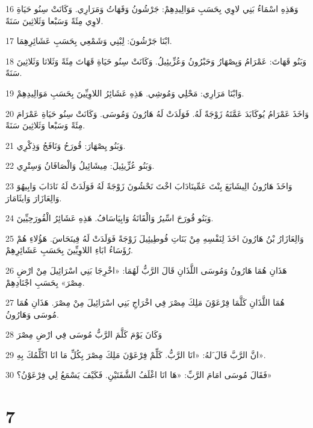 \par 16 وَهَذِهِ اسْمَاءُ بَنِي لاوِي بِحَسَبِ مَوَالِيدِهِمْ: جَرْشُونُ وَقَهَاتُ وَمَرَارِي. وَكَانَتْ سِنُو حَيَاةِ لاوِي مِئَةً وَسَبْعا وَثَلاثِينَ سَنَةً.
\par 17 ابْنَا جَرْشُونَ: لِبْنِي وَشَمْعِي بِحَسَبِ عَشَائِرِهِمَا.
\par 18 وَبَنُو قَهَاتَ: عَمْرَامُ وَيِصْهَارُ وَحَبْرُونُ وَعُزِّيئِيلُ. وَكَانَتْ سِنُو حَيَاةِ قَهَاتَ مِئَةً وَثَلاثا وَثَلاثِينَ سَنَةً.
\par 19 وَابْنَا مَرَارِي: مَحْلِي وَمُوشِي. هَذِهِ عَشَائِرُ اللاوِيِّينَ بِحَسَبِ مَوَالِيدِهِمْ.
\par 20 وَاخَذَ عَمْرَامُ يُوكَابَدَ عَمَّتَهُ زَوْجَةً لَهُ. فَوَلَدَتْ لَهُ هَارُونَ وَمُوسَى. وَكَانَتْ سِنُو حَيَاةِ عَمْرَامَ مِئَةً وَسَبْعا وَثَلاثِينَ سَنَةً.
\par 21 وَبَنُو يِصْهَارَ: قُورَحُ وَنَافَجُ وَذِكْرِي.
\par 22 وَبَنُو عُزِّيئِيلَ: مِيشَائِيلُ وَالْصَافَانُ وَسِتْرِي.
\par 23 وَاخَذَ هَارُونُ الِيشَابَعَ بِنْتَ عَمِّينَادَابَ اخْتَ نَحْشُونَ زَوْجَةً لَهُ فَوَلَدَتْ لَهُ نَادَابَ وَابِيهُوَ وَالِعَازَارَ وَايثَامَارَ.
\par 24 وَبَنُو قُورَحَ اسِّيرُ وَالْقَانَةُ وَابِيَاسَافُ. هَذِهِ عَشَائِرُ الْقُورَحِيِّينَ.
\par 25 وَالِعَازَارُ بْنُ هَارُونَ اخَذَ لِنَفْسِهِ مِنْ بَنَاتِ فُوطِيئِيلَ زَوْجَةً فَوَلَدَتْ لَهُ فِينَحَاسَ. هَؤُلاءِ هُمْ رُؤَسَاءُ ابَاءِ اللاوِيِّينَ بِحَسَبِ عَشَائِرِهِمْ.
\par 26 هَذَانِ هُمَا هَارُونُ وَمُوسَى اللَّذَانِ قَالَ الرَّبُّ لَهُمَا: «اخْرِجَا بَنِي اسْرَائِيلَ مِنْ ارْضِ مِصْرَ» بِحَسَبِ اجْنَادِهِمْ.
\par 27 هُمَا اللَّذَانِ كَلَّمَا فِرْعَوْنَ مَلِكَ مِصْرَ فِي اخْرَاجِ بَنِي اسْرَائِيلَ مِنْ مِصْرَ. هَذَانِ هُمَا مُوسَى وَهَارُونُ.
\par 28 وَكَانَ يَوْمَ كَلَّمَ الرَّبُّ مُوسَى فِي ارْضِ مِصْرَ
\par 29 انَّ الرَّبَّ قَالَ َلهُ: «انَا الرَّبُّ. كَلِّمْ فِرْعَوْنَ مَلِكَ مِصْرَ بِكُلِّ مَا انَا اكَلِّمُكَ بِهِ».
\par 30 فَقَالَ مُوسَى امَامَ الرَّبِّ: «هَا انَا اغْلَفُ الشَّفَتَيْنِ. فَكَيْفَ يَسْمَعُ لِي فِرْعَوْنُ؟»

\chapter{7}

